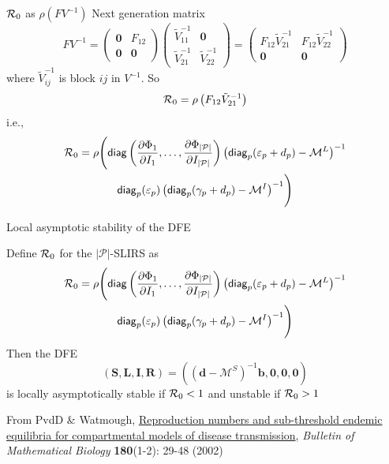 \documentclass[aspectratio=169]{beamer}\usepackage[]{graphicx}\usepackage[]{xcolor}
\begin{document}
\begin{frame}{$\mathcal{R}_0$ as $\rho(FV^{-1})$}
Next generation matrix
$$
FV^{-1}=
\begin{pmatrix}
\mathbf{0} & F_{12} \\
\mathbf{0} & \mathbf{0}
\end{pmatrix}
\begin{pmatrix}
\tilde V_{11}^{-1} & \mathbf{0} \\
\tilde V_{21}^{-1} & \tilde V_{22}^{-1}
\end{pmatrix}
=
\begin{pmatrix}
F_{12}\tilde V_{21}^{-1} & F_{12}\tilde V_{22}^{-1} \\
\mathbf{0} & \mathbf{0}
\end{pmatrix}
$$
where $\tilde V_{ij}^{-1}$ is block $ij$ in $V^{-1}$. So
$$
\mathcal{R}_0=\rho\left(F_{12}\tilde{V}_{21}^{-1}\right)
$$
i.e.,
\begin{multline*}
	\mathcal{R}_0=\rho\Biggl(
		\mathsf{diag}\left(
		\frac{\partial\Phi_1}{\partial I_1},\ldots,\frac{\partial\Phi_{|\mathcal{P}|}}{\partial I_{|\mathcal{P}|}}\right)
		\left(\mathsf{diag}_p(\varepsilon_p+d_p)-\mathcal{M}^L\right)^{-1} \\ 
		\mathsf{diag}_p(\varepsilon_p)
		\left(\mathsf{diag}_p(\gamma_p+d_p)-\mathcal{M}^I\right)^{-1}
		\Biggr)			
\end{multline*}
\end{frame}

\begin{frame}{Local asymptotic stability of the DFE}
\begin{theorem}\label{th:LAS_DFE_pSLIRS_toy}
	Define $\mathcal{R}_0$ for the $|\mathcal{P}|$-SLIRS as 
	\begin{multline*}
		\mathcal{R}_0=\rho\Biggl(
			\mathsf{diag}\left(
			\frac{\partial\Phi_1}{\partial I_1},\ldots,\frac{\partial\Phi_{|\mathcal{P}|}}{\partial I_{|\mathcal{P}|}}\right)
			\left(\mathsf{diag}_p(\varepsilon_p+d_p)-\mathcal{M}^L\right)^{-1}  \\
			\mathsf{diag}_p(\varepsilon_p)
			\left(\mathsf{diag}_p(\gamma_p+d_p)-\mathcal{M}^I\right)^{-1}
			\Biggr)				
	\end{multline*}
	Then the DFE
	$$
	(\mathbf{S},\mathbf{L},\mathbf{I},\mathbf{R})=\left((\mathbf{d}-\mathcal{M}^S)^{-1}\mathbf{b},\mathbf{0},\mathbf{0},\mathbf{0}\right)
	$$
	is locally asymptotically stable if $\mathcal{R}_0<1$ and unstable if $\mathcal{R}_0>1$		
\end{theorem}
\vfill
{\tiny
From PvdD \& Watmough, \href{https://doi.org/10.1016/S0025-5564(02)00108-6}{Reproduction numbers and sub-threshold endemic equilibria for compartmental models of disease transmission}, \emph{Bulletin of Mathematical Biology} \textbf{180}(1-2): 29-48 (2002)}
\end{frame}
\end{document}
